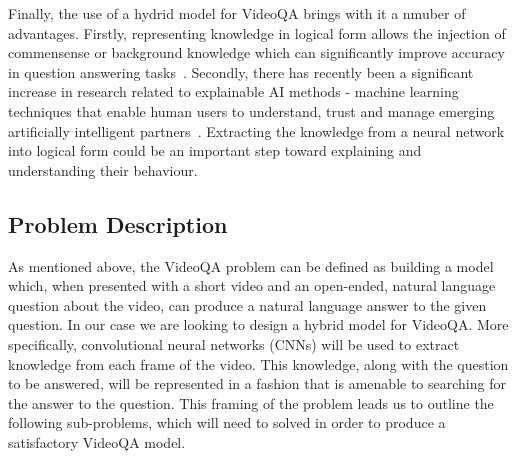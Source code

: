 \documentclass[../interim.tex]{subfiles}
\begin{document}
Finally, the use of a hydrid model for VideoQA brings with it a nmuber of advantages. Firstly, representing knowledge in logical form allows the injection of commensense or background knowledge which can significantly improve accuracy in question answering tasks~\cite{motivation:external-knowledge}. Secondly, there has recently been a significant increase in research related to explainable AI methods - machine learning techniques that enable human users to understand, trust and manage emerging artificially intelligent partners~\cite{def:xai}. Extracting the knowledge from a neural network into logical form could be an important step toward explaining and understanding their behaviour.


\subsection{Problem Description}

As mentioned above, the VideoQA problem can be defined as building a model which, when presented with a short video and an open-ended, natural language question about the video, can produce a natural language answer to the given question. In our case we are looking to design a hybrid model for VideoQA. More specifically, convolutional neural networks (CNNs) will be used to extract knowledge from each frame of the video. This knowledge, along with the question to be answered, will be represented in a fashion that is amenable to searching for the answer to the question. This framing of the problem leads us to outline the following sub-problems, which will need to solved in order to produce a satisfactory VideoQA model.
\end{document}
